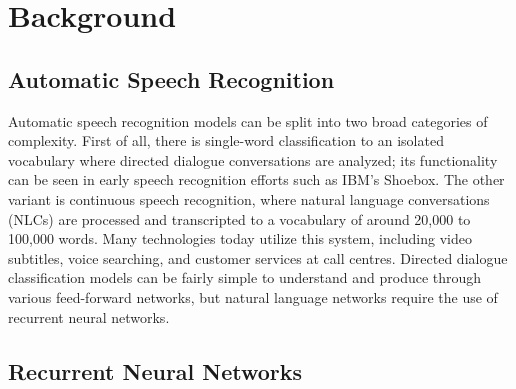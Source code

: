 
\chapter{Background} %

\label{Background} %


\section{Automatic Speech Recognition}

Automatic speech recognition models can be split into two broad categories of complexity. First of all, there is single-word classification to an isolated vocabulary where directed dialogue conversations are analyzed; its functionality can be seen in early speech recognition efforts such as IBM’s Shoebox. The other variant is continuous speech recognition, where natural language conversations (NLCs) are processed and transcripted to a vocabulary of around 20,000 to 100,000 words. Many technologies today utilize this system, including video subtitles, voice searching, and customer services at call centres. Directed dialogue classification models can be fairly simple to understand and produce through various feed-forward networks, but natural language networks require the use of recurrent neural networks.

\section{Recurrent Neural Networks}


